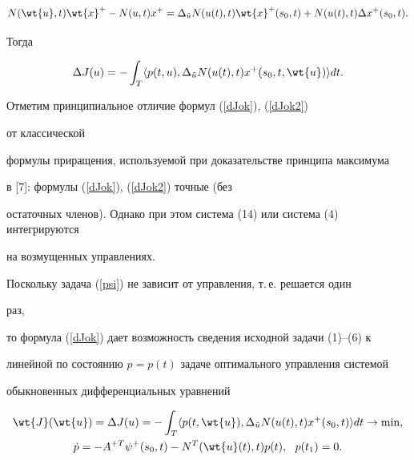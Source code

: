$$


N(\wt{u},t)\wt{x}^+-N(u,t)x^+=


\Delta_{\Tilde{u}}N(u(t),t)\wt{x}^+(s_0,t)+N(u(t),t)\Delta x^+(s_0,t).


$$


Тогда


\begin{equation}


\Delta J(u)=-\int_T \la p(t,u),


\Delta_{\Tilde{u}}N(u(t),t)x^+(s_0,t,\wt{u})\ra dt.


\label{dJok2}


\end{equation}





Отметим принципиальное отличие формул (\ref{dJok}), (\ref{dJok2}) 


от классической


формулы приращения, используемой при доказательстве принципа максимума


в [7]: формулы (\ref{dJok}), (\ref{dJok2}) точные (без


остаточных членов). Однако при этом система (14) или система (4) интегрируются 


на возмущенных управлениях.





Поскольку задача (\ref{psi}) не зависит от управления, т.\,е. решается один 


раз,


то формула (\ref{dJok}) дает возможность сведения исходной задачи (1)--(6) к


линейной по состоянию $p=p(t)$ задаче оптимального управления системой


обыкновенных дифференциальных уравнений


\begin{gather}


\wt{J}(\wt{u})=\Delta J(u)=-\int_T \la p(t,\wt{u}),


\Delta_{\Tilde{u}}N(u(t),t)x^+(s_0,t)\ra dt\rightarrow\min, \notag\\


%


\Dot{p}=-A^{+T}\psi^+(s_0,t)-N^T(\wt{u}(t),t)p(t),\ \ p(t_1)=0.


\label{dJs}


\end{gather}


